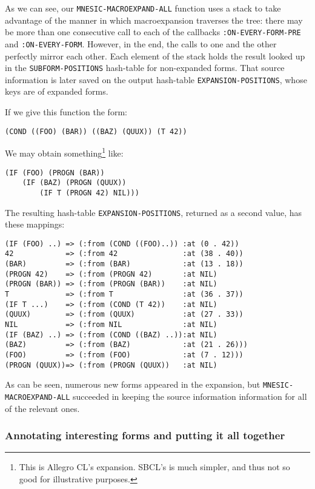 \documentclass[sigconf]{acmart}
\begin{document}
As we can see, our \texttt{MNESIC-MACROEXPAND-ALL} function uses a
stack to take advantage of the manner in which macroexpansion
traverses the tree: there may be more than one consecutive call to
each of the callbacks \texttt{:ON-EVERY-FORM-PRE} and
\texttt{:ON-EVERY-FORM}.  However, in the end, the calls to one and
the other perfectly mirror each other.  Each element of the stack
holds the result looked up in the \texttt{SUBFORM-POSITIONS}
hash-table for non-expanded forms.  That source information is later
saved on the output hash-table \texttt{EXPANSION-POSITIONS}, whose
keys are of expanded forms.

If we give this function the form:

\begin{verbatim}
(COND ((FOO) (BAR)) ((BAZ) (QUUX)) (T 42))
\end{verbatim}

We may obtain something\footnote{This is Allegro CL's
  expansion.  SBCL's is much simpler, and thus not so good for
  illustrative purposes.} like:

\begin{verbatim}
(IF (FOO) (PROGN (BAR))
    (IF (BAZ) (PROGN (QUUX))
        (IF T (PROGN 42) NIL)))
\end{verbatim}

The resulting hash-table \texttt{EXPANSION-POSITIONS}, returned as a
second value, has these mappings:

\begin{verbatim}
(IF (FOO) ..) => (:from (COND ((FOO)..)) :at (0 . 42))
42            => (:from 42               :at (38 . 40))
(BAR)         => (:from (BAR)            :at (13 . 18))
(PROGN 42)    => (:from (PROGN 42)       :at NIL)
(PROGN (BAR)) => (:from (PROGN (BAR))    :at NIL)
T             => (:from T                :at (36 . 37))
(IF T ...)    => (:from (COND (T 42))    :at NIL)
(QUUX)        => (:from (QUUX)           :at (27 . 33))
NIL           => (:from NIL              :at NIL)
(IF (BAZ) ..) => (:from (COND ((BAZ) ..)):at NIL)
(BAZ)         => (:from (BAZ)            :at (21 . 26)))
(FOO)         => (:from (FOO)            :at (7 . 12)))
(PROGN (QUUX))=> (:from (PROGN (QUUX))   :at NIL)
\end{verbatim}

As can be seen, numerous new forms appeared in the expansion, but
\texttt{MNESIC-MACROEXPAND-ALL} succeeded in keeping the source
information information for all of the relevant ones.

\subsubsection{Annotating interesting forms and putting it all
  together}\label{collecting-interesting-forms}
\end{document}
